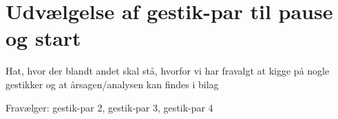 \section{Udvælgelse af gestik-par til pause og start}
\label{TestresultaterPauseStart}
%
Hat, hvor der blandt andet skal stå, hvorfor vi har fravalgt at kigge på nogle gestikker og at årsagen/analysen kan findes i bilag 

Fravælger: gestik-par 2, gestik-par 3, gestik-par 4

